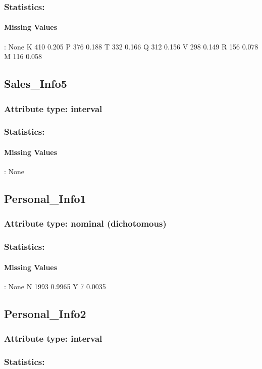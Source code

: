 \subsubsection{Statistics: }
\paragraph{Missing Values}: None
K	410	0.205
P	376	0.188
T	332	0.166
Q	312	0.156
V	298	0.149
R	156	0.078
M	116	0.058

\subsection{Sales\_Info5}
\subsubsection{Attribute type: interval}
\subsubsection{Statistics: }
\paragraph{Missing Values}: None

\subsection{Personal\_Info1}
\subsubsection{Attribute type: nominal (dichotomous)}
\subsubsection{Statistics: }
\paragraph{Missing Values}: None
N	1993	0.9965
Y	7	0.0035

\subsection{Personal\_Info2}
\subsubsection{Attribute type: interval}
\subsubsection{Statistics: }
